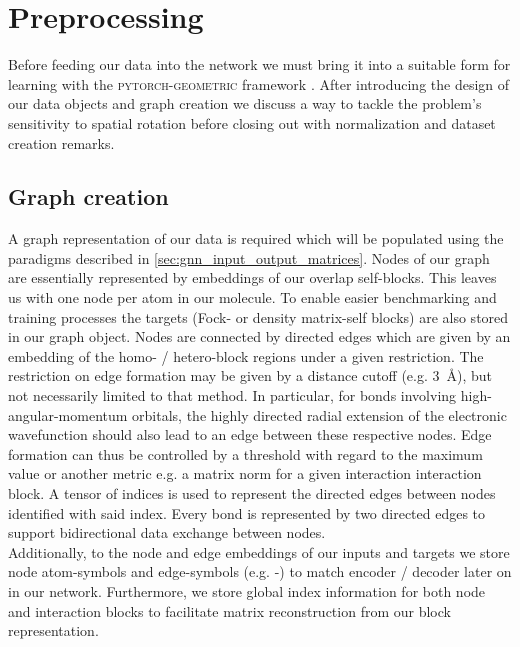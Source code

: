 \section{Preprocessing}
\label{sec:gnn_preproc}
Before feeding our data into the network we must bring it into a suitable form for learning with the \textsc{pytorch-geometric} framework \parencite{ref:PyTorchGeometric, ref:PyTorch_geom_paper}. After introducing the design of our data objects and graph creation we discuss a way to tackle the problem's sensitivity to spatial rotation before closing out with normalization and dataset creation remarks. 
\subsection{Graph creation}
\label{subsec:gnn_graph_creation}
A graph representation of our data is required which will be populated using the paradigms described in \autoref{sec:gnn_input_output_matrices}. Nodes of our graph are essentially represented by embeddings of our overlap self-blocks. This leaves us with one node per atom in our molecule. To enable easier benchmarking and training processes the targets (Fock- or density matrix-self blocks) are also stored in our graph object. Nodes are connected by directed edges which are given by an embedding of the homo- / hetero-block regions under a given restriction. The restriction on edge formation may be given by a distance cutoff (e.g. \SI{3}{\angstrom}), but not necessarily limited to that method. In particular, for bonds involving high-angular-momentum orbitals, the highly directed radial extension of the electronic wavefunction should also lead to an edge between these respective nodes. Edge formation can thus be controlled by a threshold with regard to the maximum value or another metric e.g. a matrix norm for a given interaction interaction block. A tensor of indices is used to represent the directed edges between nodes identified with said index. Every bond is represented by two directed edges to support bidirectional data exchange between nodes.\\

Additionally, to the node and edge embeddings of our inputs and targets we store node atom-symbols and edge-symbols (e.g. -) to match encoder / decoder later on in our network. Furthermore, we store global index information for both node and interaction blocks to facilitate matrix reconstruction from our block representation. 

